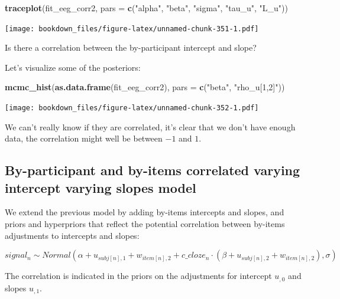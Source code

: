 \documentclass[12pt,]{krantz}
\newenvironment{Shaded}{\begin{snugshade}}{\end{snugshade}}
\newcommand{\KeywordTok}[1]{\textcolor[rgb]{0.13,0.29,0.53}{\textbf{#1}}}
\newcommand{\DataTypeTok}[1]{\textcolor[rgb]{0.13,0.29,0.53}{#1}}
\newcommand{\StringTok}[1]{\textcolor[rgb]{0.31,0.60,0.02}{#1}}
\newcommand{\NormalTok}[1]{#1}
\theoremstyle{definition}
\theoremstyle{definition}
\theoremstyle{definition}
\theoremstyle{remark}
\begin{document}
\begin{Shaded}
\begin{Highlighting}[]
\KeywordTok{traceplot}\NormalTok{(fit_eeg_corr2, }\DataTypeTok{pars =}
                           \KeywordTok{c}\NormalTok{(}\StringTok{"alpha"}\NormalTok{, }\StringTok{"beta"}\NormalTok{, }\StringTok{"sigma"}\NormalTok{, }\StringTok{"tau_u"}\NormalTok{, }\StringTok{"L_u"}\NormalTok{))}
\end{Highlighting}
\end{Shaded}

\texttt{[image: bookdown\_files/figure-latex/unnamed-chunk-351-1.pdf]}

Is there a correlation between the by-participant intercept and slope?

Let's visualize some of the posteriors:

\begin{Shaded}
\begin{Highlighting}[]
\KeywordTok{mcmc_hist}\NormalTok{(}\KeywordTok{as.data.frame}\NormalTok{(fit_eeg_corr2),}
          \DataTypeTok{pars =} \KeywordTok{c}\NormalTok{(}\StringTok{"beta"}\NormalTok{, }\StringTok{"rho_u[1,2]"}\NormalTok{))}
\end{Highlighting}
\end{Shaded}

\texttt{[image: bookdown\_files/figure-latex/unnamed-chunk-352-1.pdf]}

We can't really know if they are correlated, it's clear that we don't
have enough data, the correlation might well be between \(-1\) and
\(1\).

\subsection{By-participant and by-items correlated varying intercept
varying slopes model}\label{sec:crosscorrstan}

We extend the previous model by adding by-items intercepts and slopes,
and priors and hyperpriors that reflect the potential correlation
between by-items adjustments to intercepts and slopes:

\begin{equation}
  signal_n \sim Normal(\alpha + u_{subj[n], 1} + w_{item[n], 2} + c\_cloze_n \cdot  (\beta + u_{subj[n],2} + w_{item[n], 2}),\sigma)
\end{equation}

The correlation is indicated in the priors on the adjustments for
intercept \(u_{,0}\) and slopes \(u_{,1}\).
\end{document}
